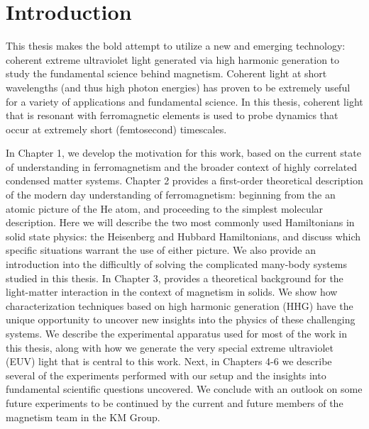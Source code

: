 \chapter{Introduction}
\label{introchap}

This thesis makes the bold attempt to utilize a new and emerging technology: coherent extreme ultraviolet light generated via high harmonic generation to study the fundamental science behind magnetism. Coherent light at short wavelengths (and thus high photon energies) has proven to be extremely useful for a variety of applications and fundamental science. In this thesis, coherent light that is resonant with ferromagnetic elements is used to probe dynamics that occur at extremely short (femtosecond) timescales.

In Chapter 1, we develop the motivation for this work, based on the current state of understanding in ferromagnetism and the broader context of highly correlated condensed matter systems. Chapter 2 provides a first-order theoretical description of the modern day understanding of ferromagnetism: beginning from the an atomic picture of the He atom, and proceeding to the simplest molecular description. Here we will describe the two most commonly used Hamiltonians in solid state physics: the Heisenberg and Hubbard Hamiltonians, and discuss which specific situations warrant the use of either picture. We also provide an introduction into the difficultly of solving the complicated many-body systems studied in this thesis. In Chapter 3, provides a theoretical background for the light-matter interaction in the context of magnetism in solids. We show how characterization techniques based on high harmonic generation (HHG) have the unique opportunity to uncover new insights into the physics of these challenging systems. We describe the experimental apparatus used for most of the work in this thesis, along with how we generate the very special extreme ultraviolet (EUV) light that is central to this work. Next, in Chapters 4-6 we describe several of the experiments performed with our setup and the insights into fundamental scientific questions uncovered. We conclude with an outlook on some future experiments to be continued by the current and future members of the magnetism team in the KM Group.


